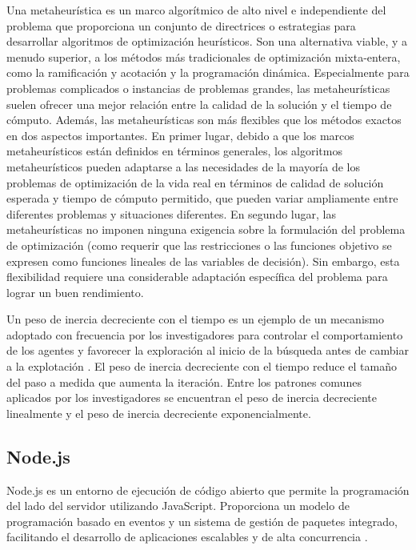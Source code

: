 \documentclass[conference]{IEEEtran}
\begin{document}
Una metaheurística es un marco algorítmico de alto nivel e independiente del
problema que proporciona un conjunto de directrices o estrategias para
desarrollar algoritmos de optimización heurísticos. Son una alternativa viable,
y a menudo superior, a los métodos más tradicionales de optimización
mixta-entera, como la ramificación y acotación y la programación dinámica.
Especialmente para problemas complicados o instancias de problemas grandes, las
metaheurísticas suelen ofrecer una mejor relación entre la calidad de la
solución y el tiempo de cómputo. Además, las metaheurísticas son más flexibles
que los métodos exactos en dos aspectos importantes. En primer lugar, debido a
que los marcos metaheurísticos están definidos en términos generales, los
algoritmos metaheurísticos pueden adaptarse a las necesidades de la mayoría de
los problemas de optimización de la vida real en términos de calidad de
solución esperada y tiempo de cómputo permitido, que pueden variar ampliamente
entre diferentes problemas y situaciones diferentes. En segundo lugar, las
metaheurísticas no imponen ninguna exigencia sobre la formulación del problema
de optimización (como requerir que las restricciones o las funciones objetivo
se expresen como funciones lineales de las variables de decisión). Sin embargo,
esta flexibilidad requiere una considerable adaptación específica del problema
para lograr un buen rendimiento\cite{soerensen2010}.

Un peso de inercia decreciente con el tiempo es un ejemplo de un mecanismo
adoptado con frecuencia por los investigadores para controlar el comportamiento
de los agentes y favorecer la exploración al inicio de la búsqueda antes de
cambiar a la explotación \cite{eberhart2000, bansal2011,
    elkhateeb2013}. El peso de inercia decreciente con el tiempo reduce el tamaño del paso a medida que aumenta la
iteración. Entre los patrones comunes aplicados por los investigadores se
encuentran el peso de inercia decreciente linealmente y el peso de inercia
decreciente exponencialmente\cite{bansal2011}.

\subsection{Node.js}
Node.js es un entorno de ejecución de código abierto que permite la
programación del lado del servidor utilizando JavaScript. Proporciona un modelo
de programación basado en eventos y un sistema de gestión de paquetes
integrado, facilitando el desarrollo de aplicaciones escalables y de alta
concurrencia \cite{shah2017}.
\end{document}
